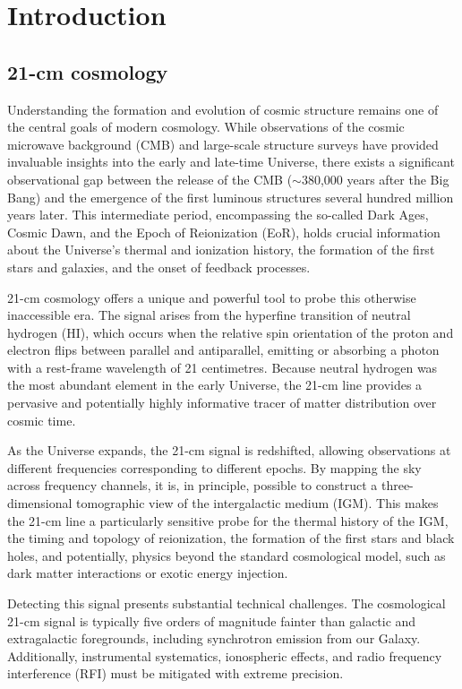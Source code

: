 \documentclass[floats,floatfix,showpacs,amssymb,prd,superscriptaddress,nofootinbib]{revtex4-2} %
\begin{document}

\newpage

{\tableofcontents}
\newpage
\section{Introduction}
\subsection{21-cm cosmology}
Understanding the formation and evolution of cosmic structure remains one of the central goals of modern cosmology. While observations of the cosmic microwave background (CMB) and large-scale structure surveys have provided invaluable insights into the early and late-time Universe, there exists a significant observational gap between the release of the CMB ($\sim$380,000 years after the Big Bang) and the emergence of the first luminous structures several hundred million years later. This intermediate period, encompassing the so-called Dark Ages, Cosmic Dawn, and the Epoch of Reionization (EoR), holds crucial information about the Universe's thermal and ionization history, the formation of the first stars and galaxies, and the onset of feedback processes.

21-cm cosmology offers a unique and powerful tool to probe this otherwise inaccessible era. The signal arises from the hyperfine transition of neutral hydrogen (HI), which occurs when the relative spin orientation of the proton and electron flips between parallel and antiparallel, emitting or absorbing a photon with a rest-frame wavelength of 21 centimetres. Because neutral hydrogen was the most abundant element in the early Universe, the 21-cm line provides a pervasive and potentially highly informative tracer of matter distribution over cosmic time.

As the Universe expands, the 21-cm signal is redshifted, allowing observations at different frequencies corresponding to different epochs. By mapping the sky across frequency channels, it is, in principle, possible to construct a three-dimensional tomographic view of the intergalactic medium (IGM). This makes the 21-cm line a particularly sensitive probe for the thermal history of the IGM, the timing and topology of reionization, the formation of the first stars and black holes, and potentially, physics beyond the standard cosmological model, such as dark matter interactions or exotic energy injection.

Detecting this signal presents substantial technical challenges. The cosmological 21-cm signal is typically five orders of magnitude fainter than galactic and extragalactic foregrounds, including synchrotron emission from our Galaxy. Additionally, instrumental systematics, ionospheric effects, and radio frequency interference (RFI) must be mitigated with extreme precision.
\end{document}
